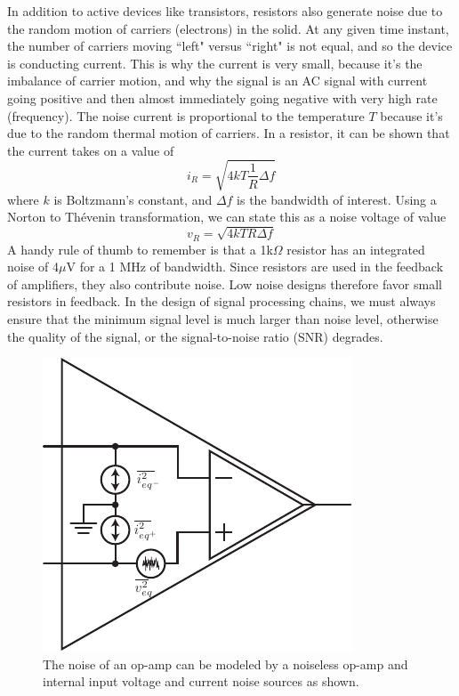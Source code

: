 In addition to active devices like transistors, resistors also generate noise due to the random motion of carriers (electrons) in the solid.  At any given time instant, the number of carriers moving ``left" versus ``right" is not equal, and so the device is conducting current. This is why the current is very small, because it's the imbalance of carrier motion, and why the signal is an AC signal with current going positive and then almost immediately going negative with very high rate (frequency).  The noise current is proportional to the temperature $T$ because it's due to the random thermal motion of carriers.  In a resistor, it can be shown that the current takes on a value of
%
\begin{equation}
	i_R = \sqrt{4 k T \frac{1}{R} \Delta f} 
\end{equation}
%
where $k$ is Boltzmann's constant, and $\Delta f$ is the bandwidth of interest.   Using a Norton to Thévenin transformation, we can state this as a noise voltage of value
%
\begin{equation}
	v_R = \sqrt{4 k T R \Delta f} 
\end{equation}
%
A handy rule of thumb to remember is that a 1k$\Omega$ resistor has an integrated noise of 4$\mu$V for a 1 MHz of bandwidth.   Since resistors are used in the feedback of amplifiers, they also contribute noise. Low noise designs therefore favor small resistors in feedback.  In the design of signal processing chains, we must always ensure that the minimum signal level is much larger than noise level, otherwise the quality of the signal, or the signal-to-noise ratio (SNR) degrades.





\begin{figure}[tb]
\begin{center}
\includegraphics[scale=1]{opamp_noise}
\end{center}
\caption{The noise of an op-amp can be modeled by a noiseless op-amp and internal input voltage and current noise sources as shown.} \label{fig:opamp_noise}
\end{figure}







